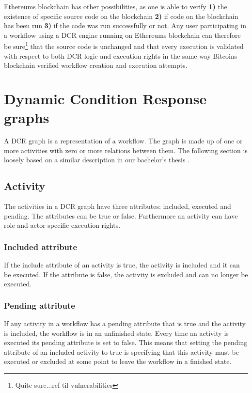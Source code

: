 \documentclass{article}
\begin{document}
	Ethereums blockchain has other possibilities, as one is able to verify \textbf{1)} the existence of specific source code on the blockchain \textbf{2)} if code on the blockchain has been run \textbf{3)} if the code was run successfully or not.
	Any user participating in a workflow using a DCR engine running on Ethereums blockchain can therefore be sure\footnote{Quite sure...ref til vulnerabilities} that the source code is unchanged and that every execution is validated with respect to both DCR logic and execution rights in the same way Bitcoins blockchain verified workflow creation and execution attempts.

	\section{Dynamic Condition Response graphs}
	\label{sec:dcr-graphs}
	A DCR graph is a representation of a workflow.
	The graph is made up of one or more activities with zero or more relations between them. 
	The following section is loosely based on a similar description in our bachelor's thesis \cite{bachelor}. 

	\subsection{Activity}
	The activities in a DCR graph have three attributes: included, executed and pending. 
	The attributes can be true or false. 
	Furthermore an activity can have role and actor specific execution rights.

	\subsubsection{Included attribute}
	If the include attribute of an activity is true, the activity is included and it can be executed. 
	If the attribute is false, the activity is excluded and can no longer be executed.

	\subsubsection{Pending attribute}
	If any activity in a workflow has a pending attribute that is true and the activity is included, the workflow is in an unfinished state.
	Every time an activity is executed its pending attribute is set to false.
	This means that setting the pending attribute of an included activity to true is specifying that this activity must be executed or excluded at some point to leave the workflow in a finished state.
\end{document}
